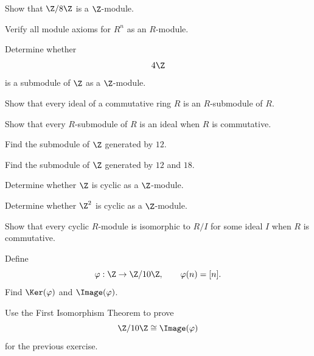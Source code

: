 \begin{exercise}[1]
Show that \(\Z/8\Z\) is a \(\Z\)-module.
\end{exercise}

\begin{exercise}[2]
Verify all module axioms for \(R^n\) as an \(R\)-module.
\end{exercise}

\begin{exercise}[1]
Determine whether
\[ 4\Z \]
is a submodule of \(\Z\) as a \(\Z\)-module.
\end{exercise}

\begin{exercise}[2]
Show that every ideal of a commutative ring \(R\) is an \(R\)-submodule of
\(R\).
\end{exercise}

\begin{exercise}[2]
Show that every \(R\)-submodule of \(R\) is an ideal when \(R\) is
commutative.
\end{exercise}

\begin{exercise}[1]
Find the submodule of \(\Z\) generated by \(12\).
\end{exercise}

\begin{exercise}[2]
Find the submodule of \(\Z\) generated by \(12\) and \(18\).
\end{exercise}

\begin{exercise}[1]
Determine whether \(\Z\) is cyclic as a \(\Z\)-module.
\end{exercise}

\begin{exercise}[1]
Determine whether \(\Z^2\) is cyclic as a \(\Z\)-module.
\end{exercise}

\begin{exercise}[2]
Show that every cyclic \(R\)-module is isomorphic to \(R/I\) for some ideal
\(I\) when \(R\) is commutative.
\end{exercise}

\begin{exercise}[2]
Define
\[ \varphi:\Z\to\Z/10\Z,\qquad\varphi(n)=[n]. \]
Find \(\Ker(\varphi)\) and \(\Image(\varphi)\).
\end{exercise}

\begin{exercise}[2]
Use the First Isomorphism Theorem to prove
\[ \Z/10\Z\cong\Image(\varphi) \]
for the previous exercise.
\end{exercise}

